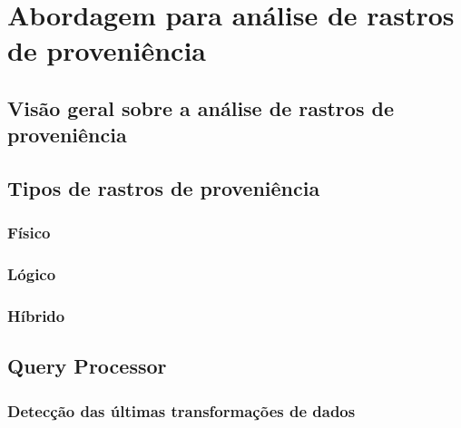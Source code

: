 
\chapter{Abordagem para análise de rastros de proveniência}%
\label{chap:rastros-de-proveniencia}


\section{Visão geral sobre a análise de rastros de proveniência}

 
\section{Tipos de rastros de proveniência}


\subsection{Físico}

\subsection{Lógico}

\subsection{Híbrido}


\section{Query Processor}



\subsection{Detecção das últimas transformações de dados}

